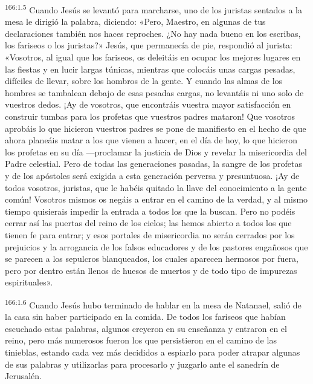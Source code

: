 \par 
\textsuperscript{166:1.5} Cuando Jesús se levantó para marcharse, uno de los juristas sentados a la mesa le dirigió la palabra, diciendo: «Pero, Maestro, en algunas de tus declaraciones también nos haces reproches. ¿No hay nada bueno en los escribas, los fariseos o los juristas?» Jesús, que permanecía de pie, respondió al jurista: «Vosotros, al igual que los fariseos, os deleitáis en ocupar los mejores lugares en las fiestas y en lucir largas túnicas, mientras que colocáis unas cargas pesadas, difíciles de llevar, sobre los hombros de la gente. Y cuando las almas de los hombres se tambalean debajo de esas pesadas cargas, no levantáis ni uno solo de vuestros dedos. ¡Ay de vosotros, que encontráis vuestra mayor satisfacción en construir tumbas para los profetas que vuestros padres mataron! Que vosotros aprobáis lo que hicieron vuestros padres se pone de manifiesto en el hecho de que ahora planeáis matar a los que vienen a hacer, en el día de hoy, lo que hicieron los profetas en su día ---proclamar la justicia de Dios y revelar la misericordia del Padre celestial. Pero de todas las generaciones pasadas, la sangre de los profetas y de los apóstoles será exigida a esta generación perversa y presuntuosa. ¡Ay de todos vosotros, juristas, que le habéis quitado la llave del conocimiento a la gente común! Vosotros mismos os negáis a entrar en el camino de la verdad, y al mismo tiempo quisierais impedir la entrada a todos los que la buscan. Pero no podéis cerrar así las puertas del reino de los cielos; las hemos abierto a todos los que tienen fe para entrar; y esos portales de misericordia no serán cerrados por los prejuicios y la arrogancia de los falsos educadores y de los pastores engañosos que se parecen a los sepulcros blanqueados, los cuales aparecen hermosos por fuera, pero por dentro están llenos de huesos de muertos y de todo tipo de impurezas espirituales».

\par 
\textsuperscript{166:1.6} Cuando Jesús hubo terminado de hablar en la mesa de Natanael, salió de la casa sin haber participado en la comida. De todos los fariseos que habían escuchado estas palabras, algunos creyeron en su enseñanza y entraron en el reino, pero más numerosos fueron los que persistieron en el camino de las tinieblas, estando cada vez más decididos a espiarlo para poder atrapar algunas de sus palabras y utilizarlas para procesarlo y juzgarlo ante el sanedrín de Jerusalén.

